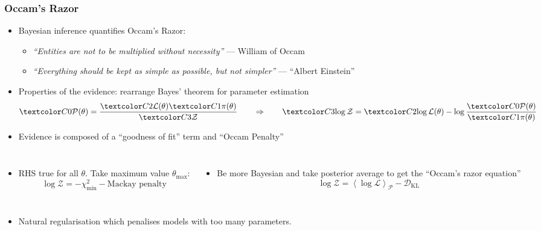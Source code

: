 \documentclass[aspectratio=169]{beamer}
\newcommand{\av}[2][1]{\left\langle #2\right\rangle_{#1}}
\begin{document}
\begin{frame}
    \frametitle{Occam's Razor~}
    \begin{itemize}
        \item Bayesian inference quantifies Occam's Razor:
            \begin{itemize}
                \item \textit{``Entities are not to be multiplied without necessity''} \hfill --- William of Occam
                \item \textit{``Everything should be kept as simple as possible, but not simpler''} \hfill --- ``Albert Einstein''
            \end{itemize}
        \item Properties of the evidence: rearrange Bayes' theorem for parameter estimation
            \[\C[0]{\mathcal{P}(\theta)} = \frac{\C[2]{\mathcal{L}(\theta)} \C[1]{\pi(\theta)}}{\C[3]{\mathcal{Z}}} \qquad\Rightarrow\qquad \C[3]{\log \mathcal{Z}} = \C[2]{\log\mathcal{L}(\theta)} - \log \frac{\C[0]{\mathcal{P}(\theta)}}{\C[1]{\pi(\theta)}} \]  
        \item Evidence is composed of a ``goodness of fit'' term  and ``Occam Penalty''
    \end{itemize}
    \begin{columns}[t]
    \begin{itemize}
        \item RHS true for all $\theta$. Take maximum value $\theta_\mathrm{max}$:
            \[
                \log \mathcal{Z} = -\chi_\mathrm{min}^2 - \text{Mackay penalty}
            \]
    \end{itemize}
    \begin{itemize}
        \item Be more Bayesian and take posterior average to get the ``Occam's razor equation''
            \[
                \boxed{
                    \log \mathcal{Z} = \av[\mathcal{P}]{\log\mathcal{L}} - \mathcal{D}_\mathrm{KL}
            }
            \]
    \end{itemize}
    \end{columns}
    \vfill
    \begin{itemize}
        \item Natural regularisation which penalises models with too many parameters.
    \end{itemize}
\end{frame}
\end{document}
